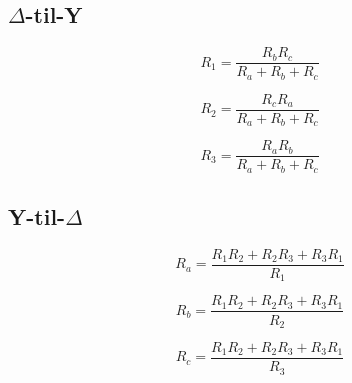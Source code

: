 \documentclass[norsk, a4paper, 12pt, twoside, titlepage]{article}
\begin{document}
\subsection{$\Delta$-til-Y}

\begin{equation}
R_{1} = \frac{R_{b}R_{c}}{R_{a} + R_{b} + R_{c}}
\end{equation}

\begin{equation}
R_{2} = \frac{R_{c}R_{a}}{R_{a} + R_{b} + R_{c}}
\end{equation}

\begin{equation}
R_{3} = \frac{R_{a}R_{b}}{R_{a} + R_{b} + R_{c}}
\end{equation}

\subsection{Y-til-$\Delta$}

\begin{equation}
R_{a} = \frac{R_{1}R_{2} + R_{2}R_{3} + R_{3}R_{1}}{R_{1}}
\end{equation}

\begin{equation}
R_{b} = \frac{R_{1}R_{2} + R_{2}R_{3} + R_{3}R_{1}}{R_{2}}
\end{equation}

\begin{equation}
R_{c} = \frac{R_{1}R_{2} + R_{2}R_{3} + R_{3}R_{1}}{R_{3}}
\end{equation}


\newpage
\printindex
\end{document}
